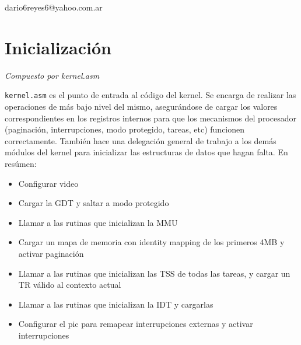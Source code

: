 \documentclass{article}
\begin{document}
	\fecha{\today}

		{dario6reyes6@yahoo.com.ar}
	
	
	\maketitle
	
	\tableofcontents

	\pagebreak
	
	
	\section{Inicialización}
	\vspace{-1cm}	
	\begin{flushright}
	\textit{Compuesto por kernel.asm}
	\end{flushright}
		
	\texttt{kernel.asm} es el punto de entrada al código del kernel. Se encarga de realizar las operaciones de más bajo nivel del mismo, asegurándose de cargar los valores correspondientes en los registros internos para que los mecanismos del procesador (paginación, interrupciones, modo protegido, tareas, etc) funcionen correctamente. También hace una delegación general de trabajo a los demás módulos del kernel para inicializar las estructuras de datos que hagan falta. En resúmen:
	
	\begin{itemize}[topsep=0pt]
		\item Configurar video
		\item Cargar la GDT y saltar a modo protegido
		\item Llamar a las rutinas que inicializan la MMU
		\item Cargar un mapa de memoria con identity mapping de los primeros 4MB y activar paginación
		\item Llamar a las rutinas que inicializan las TSS de todas las tareas, y cargar un TR válido al contexto actual
		\item Llamar a las rutinas que inicializan la IDT y cargarlas
		\item Configurar el pic para remapear interrupciones externas y activar interrupciones
	\end{itemize}
	
\end{document}
